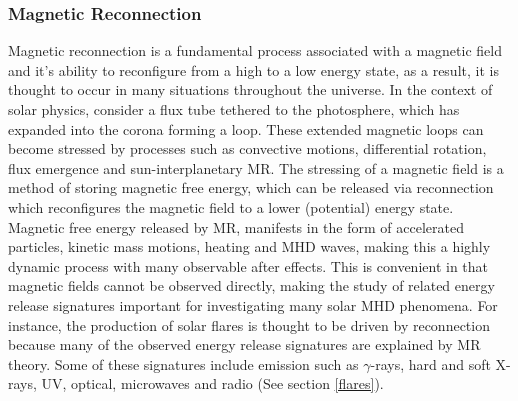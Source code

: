 \subsubsection{Magnetic Reconnection}\label{MR}
Magnetic reconnection is a fundamental process associated with a magnetic field and it's ability to reconfigure from a high to a low energy state, as a result, it is thought to occur in many situations throughout the universe. In the context of solar physics, consider a flux tube tethered to the photosphere, which has expanded into the corona forming a loop. These extended magnetic loops can become stressed by processes such as convective motions, differential rotation, flux emergence and sun-interplanetary MR. The stressing of a magnetic field is a method of storing magnetic free energy, which can be released via reconnection which reconfigures the magnetic field to a lower (potential) energy state. Magnetic free energy released by MR, manifests in the form of accelerated particles, kinetic mass motions, heating and MHD waves, making this a highly dynamic process with many observable after effects. This is convenient in that magnetic fields cannot be observed directly, making the study of related energy release signatures important for investigating many solar MHD phenomena. For instance, the production of solar flares is thought to be driven by reconnection because many of the observed energy release signatures are explained by MR theory. Some of these signatures include emission such as $\gamma$-rays, hard and soft X-rays, UV, optical, microwaves and radio (See section \ref{flares}).


